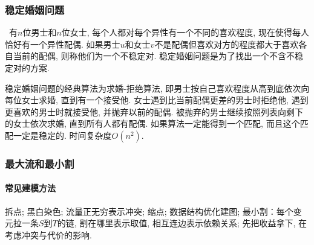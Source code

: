 \subsubsection{稳定婚姻问题}\
         有$n$位男士和$n$位女士, 每个人都对每个异性有一个不同的喜欢程度, 现在使得每人恰好有一个异性配偶. 如果男士$u$和女士$v$不是配偶但喜欢对方的程度都大于喜欢各自当前的配偶, 则称他们为一个不稳定对. 稳定婚姻问题是为了找出一个不含不稳定对的方案. 
         \par 稳定婚姻问题的经典算法为求婚-拒绝算法, 即男士按自己喜欢程度从高到底依次向每位女士求婚, 直到有一个接受他. 女士遇到比当前配偶更差的男士时拒绝他, 遇到更喜欢的男士时就接受他, 并抛弃以前的配偶. 被抛弃的男士继续按照列表向剩下的女士依次求婚, 直到所有人都有配偶. 如果算法一定能得到一个匹配, 而且这个匹配一定是稳定的. 时间复杂度$O(n^2)$. 
\subsubsection{最大流和最小割}
	\paragraph{常见建模方法} 拆点; 黑白染色; 流量正无穷表示冲突; 缩点; 数据结构优化建图; 最小割：每个变元拉一条$S$到$T$的链, 割在哪里表示取值, 相互连边表示依赖关系; 先把收益拿下, 在考虑冲突与代价的影响. 
